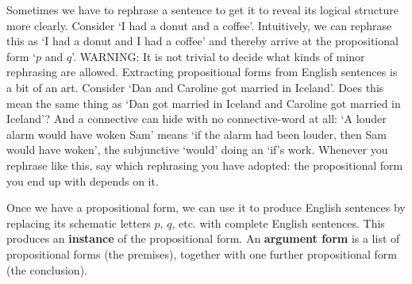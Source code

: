 \documentclass[options]{philosophersimprint}
\theoremstyle{definition}
\begin{document}
Sometimes we have to rephrase a sentence to get it to reveal its logical structure more clearly. Consider `I had a donut and a coffee'. Intuitively, we can rephrase this as `I had a donut and I had a coffee' and thereby arrive at the propositional form `$p$ and $q$'. WARNING: It is not trivial to decide what kinds of minor rephrasing are allowed. Extracting propositional forms from English sentences is a bit of an art. Consider `Dan and Caroline got married in Iceland'. Does this mean the same thing as `Dan got married in Iceland and Caroline got married in Iceland'? And a connective can hide with no connective-word at all: `A louder alarm would have woken Sam' means `if the alarm had been louder, then Sam would have woken', the subjunctive `would' doing an `if's work. Whenever you rephrase like this, say which rephrasing you have adopted: the propositional form you end up with depends on it.

Once we have a propositional form, we can use it to produce English sentences by replacing its schematic letters $p$, $q$, etc. with complete English sentences. This produces an \textbf{instance} of the propositional form. An \textbf{argument form} is a list of propositional forms (the premises), together with one further propositional form (the conclusion).
\end{document}
